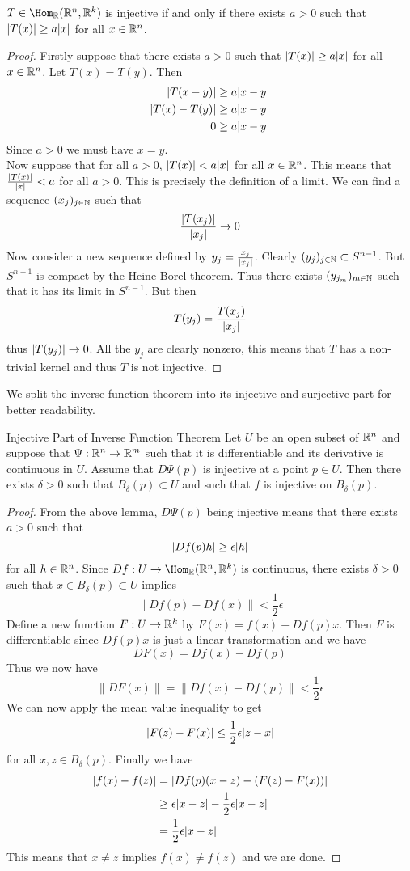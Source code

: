 \documentclass[a4paper]{article}
\begin{document}
\begin{lmm}{}{} $T\in\Hom_\R(\R^n,\R^k)$ is injective if and only if there exists $a>0$ such that $\abs{T(x)}\geq a\abs{x}$ for all $x\in\mathbb{R}^n$. 
\begin{proof}
Firstly suppose that there exists $a>0$ such that $\abs{T(x)}\geq a\abs{x}$ for all $x\in\mathbb{R}^n$. Let $T(x)=T(y)$. Then 
\begin{align*}
\abs{T(x-y)}&\geq a\abs{x-y}\\
\abs{T(x)-T(y)}&\geq a\abs{x-y}\\
0&\geq a\abs{x-y}
\end{align*}
Since $a>0$ we must have $x=y$. \\
Now suppose that for all $a>0$, $\abs{T(x)}<a\abs{x}$ for all $x\in\mathbb{R}^n$. This means that $\frac{\abs{T(x)}}{\abs{x}}<a$ for all $a>0$. This is precisely the definition of a limit. We can find a sequence $(x_j)_{j\in\mathbb{N}}$ such that $$\frac{\abs{T(x_j)}}{\abs{x_j}}\to 0$$ Now consider a new sequence defined by $y_j=\frac{x_j}{\abs{x_j}}$. Clearly $(y_j)_{j\in\mathbb{N}}\subset S^{n-1}$. But $S^{n-1}$ is compact by the Heine-Borel theorem. Thus there exists $(y_{j_m})_{m\in\mathbb{N}}$ such that it has its limit in $S^{n-1}$. But then $$T(y_j)=\frac{T(x_j)}{\abs{x_j}}$$ thus $\abs{T(y_j)}\to 0$. All the $y_j$ are clearly nonzero, this means that $T$ has a non-trivial kernel and thus $T$ is not injective. 
\end{proof}
\end{lmm}

We split the inverse function theorem into its injective and surjective part for better readability. 

\begin{prp}{Injective Part of Inverse Function Theorem}{} Let $U$ be an open subset of $\mathbb{R}^n$ and suppose that $\Psi:\mathbb{R}^n\to\mathbb{R}^m$ such that it is differentiable and its derivative is continuous in $U$. Assume that $D\Psi(p)$ is injective at a point $p\in U$. Then there exists $\delta>0$ such that $B_\delta(p)\subset U$ and such that $f$ is injective on $B_\delta(p)$. 
\begin{proof}
From the above lemma, $D\Psi(p)$ being injective means that there exists $a>0$ such that $$\abs{Df(p)h}\geq\epsilon\abs{h}$$ for all $h\in\mathbb{R}^n$. Since $Df:U\to\Hom_\R(\R^n,\R^k)$ is continuous, there exists $\delta>0$ such that $x\in B_\delta(p)\subset U$ implies $$\|Df(p)-Df(x)\|<\frac{1}{2}\epsilon$$ Define a new function $F:U\to\mathbb{R}^k$ by $F(x)=f(x)-Df(p)x$. Then $F$ is differentiable since $Df(p)x$ is just a linear transformation and we have $$DF(x)=Df(x)-Df(p)$$ Thus we now have $$\|DF(x)\|=\|Df(x)-Df(p)\|<\frac{1}{2}\epsilon$$ We can now apply the mean value inequality to get $$\abs{F(z)-F(x)}\leq\frac{1}{2}\epsilon\abs{z-x}$$ for all $x,z\in B_\delta(p)$. Finally we have 
\begin{align*}
\abs{f(x)-f(z)}&=\abs{Df(p)(x-z)-(F(z)-F(x))}\\
&\geq\epsilon\abs{x-z}-\frac{1}{2}\epsilon\abs{x-z}\\
&=\frac{1}{2}\epsilon\abs{x-z}
\end{align*}
This means that $x\neq z$ implies $f(x)\neq f(z)$ and we are done. 
\end{proof}
\end{prp}
\end{document}
